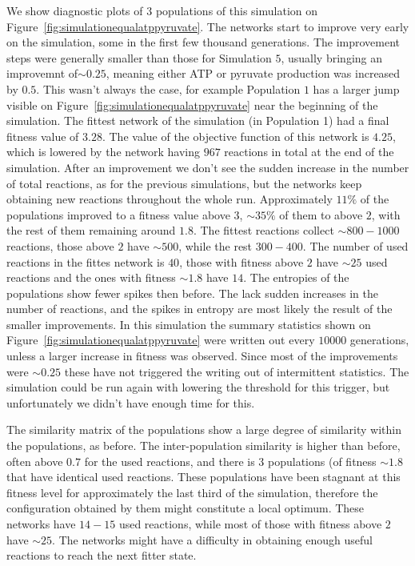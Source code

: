 \documentclass[a4paper,12pt]{article}
\begin{document}
We show diagnostic plots of $3$ populations of this simulation on Figure~\ref{fig:simulationequalatppyruvate}. The networks start to improve very early on the simulation, some in the first few thousand generations. The improvement steps were generally smaller than those for Simulation $5$, usually bringing an improvemnt of$\sim 0.25$, meaning either ATP or pyruvate production was increased by $0.5$. This wasn't always the case, for example Population $1$ has a larger jump visible on Figure~\ref{fig:simulationequalatppyruvate} near the beginning of the simulation. The fittest network of the simulation (in Population 1) had a final fitness value of $3.28$. The value of the objective function of this network is $4.25$, which is lowered by the network having $967$ reactions in total at the end of the simulation. After an improvement we don't see the sudden increase in the number of total reactions, as for the previous simulations, but the networks keep obtaining new reactions throughout the whole run. Approximately $11\%$ of the populations improved to a fitness value above $3$, $\sim 35\%$ of them to above $2$, with the rest of them remaining around $1.8$. The fittest reactions collect $\sim 800-1000$ reactions, those above $2$ have $\sim 500$, while the rest $300-400$. The number of used reactions in the fittes network is $40$, those with fitness above $2$ have $\sim 25$ used reactions and the ones with fitness $\sim1.8$ have $14$. The entropies of the populations show fewer spikes then before. The lack sudden increases in the number of reactions, and the spikes in entropy are most likely the result of the smaller improvements. In this simulation the summary statistics shown on Figure~\ref{fig:simulationequalatppyruvate} were written out every $10000$ generations, unless a larger increase in fitness was observed. Since most of the improvements were $\sim 0.25$ these have not triggered the writing out of intermittent statistics. The simulation could be run again with lowering the threshold for this trigger, but unfortunately we didn't have enough time for this. 

The similarity matrix of the populations show a large degree of similarity within the populations, as before. The inter-population similarity is higher than before, often above $0.7$ for the used reactions, and there is $3$ populations (of fitness $\sim 1.8$ that have identical used reactions. These populations have been stagnant at this fitness level for approximately the last third of the simulation, therefore the configuration obtained by them might constitute a local optimum. These networks have $14-15$ used reactions, while most of those with fitness above $2$ have $\sim 25$. The networks might have a difficulty in obtaining enough useful reactions to reach the next fitter state. 
\end{document}
